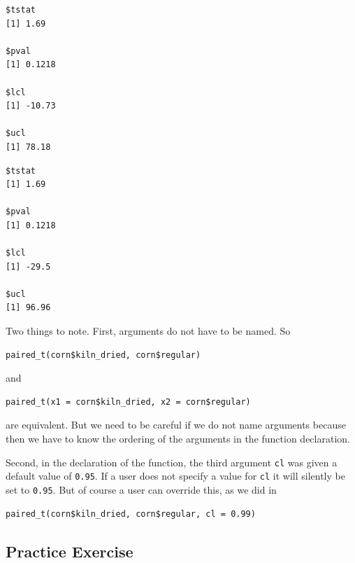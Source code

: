 \documentclass[]{krantz}
\makeatletter
\newenvironment{Shaded}{\begin{snugshade}}{\end{snugshade}}
\newcommand{\KeywordTok}[1]{\textcolor[rgb]{0.27,0.27,0.27}{\textbf{#1}}}
\newcommand{\DataTypeTok}[1]{\textcolor[rgb]{0.27,0.27,0.27}{#1}}
\newcommand{\FloatTok}[1]{\textcolor[rgb]{0.06,0.06,0.06}{#1}}
\newcommand{\StringTok}[1]{\textcolor[rgb]{0.5,0.5,0.5}{#1}}
\newcommand{\OperatorTok}[1]{\textcolor[rgb]{0.43,0.43,0.43}{\textbf{#1}}}
\newcommand{\NormalTok}[1]{#1}
\newenvironment{kframe}{%
\medskip{}
\setlength{\fboxsep}{.8em}
 \def\at@end@of@kframe{}%
 \ifinner\ifhmode%
  \def\at@end@of@kframe{\end{minipage}}%
  \begin{minipage}{\columnwidth}%
 \fi\fi%
 \def\FrameCommand##1{\hskip\@totalleftmargin \hskip-\fboxsep
 \colorbox{shadecolor}{##1}\hskip-\fboxsep
     \hskip-\linewidth \hskip-\@totalleftmargin \hskip\columnwidth}%
 \MakeFramed {\advance\hsize-\width
   \@totalleftmargin\z@ \linewidth\hsize
   \@setminipage}}%
 {\par\unskip\endMakeFramed%
 \at@end@of@kframe}
\renewenvironment{Shaded}{\begin{kframe}}{\end{kframe}}
\makeatother
\begin{document}
\begin{verbatim}
$tstat
[1] 1.69

$pval
[1] 0.1218

$lcl
[1] -10.73

$ucl
[1] 78.18
\end{verbatim}

\begin{Shaded}
\end{Shaded}

\begin{verbatim}
$tstat
[1] 1.69

$pval
[1] 0.1218

$lcl
[1] -29.5

$ucl
[1] 96.96
\end{verbatim}

Two things to note. First, arguments do not have to be named. So

\begin{verbatim}
paired_t(corn$kiln_dried, corn$regular)
\end{verbatim}

and

\begin{verbatim}
paired_t(x1 = corn$kiln_dried, x2 = corn$regular)
\end{verbatim}

are equivalent. But we need to be careful if we do not name arguments
because then we have to know the ordering of the arguments in the
function declaration.

Second, in the declaration of the function, the third argument
\texttt{cl} was given a default value of \texttt{0.95}. If a user does
not specify a value for \texttt{cl} it will silently be set to
\texttt{0.95}. But of course a user can override this, as we did in

\begin{verbatim}
paired_t(corn$kiln_dried, corn$regular, cl = 0.99)
\end{verbatim}

\subsection{Practice Exercise}\label{practice-exercise-11}
\end{document}
